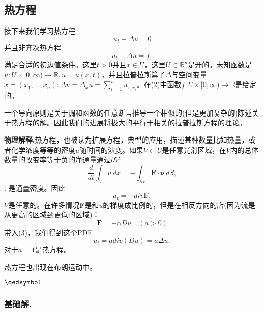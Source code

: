 \documentclass[leqno]{article}
\numberwithin{equation}{subsection}%
\begin{document}
\subsection{热方程}
接下来我们学习热方程
\begin{equation}
u_{t}-\Delta u=0
\end{equation}
并且非齐次热方程
\begin{equation}
u_{t}-\Delta u=f,
\end{equation}
满足合适的初边值条件。这里$t>0$并且$x\in U$，这里$U\subset\mathbb{R}^{n}$是开的。未知函数是$u:\bar{U}\times[0,\infty)\rightarrow\mathbb{R},u=u(x,t)$，并且拉普拉斯算子$\Delta$与空间变量$x=(x_{1},...,x_{n}):\Delta u=\Delta_{x}u=\sum_{i=1}^{n}u_{x_{i}x_{i}}$。在(2)中函数$f:U\times[0,\infty)\rightarrow\mathbb{R}$是给定的。
\par
一个导向原则是关于调和函数的任意断言推导一个相似的(但是更加复杂的)陈述关于热方程的解。因此我们的进展将极大的平行于相关的拉普拉斯方程的理论。
\par
\noindent\textbf{物理解释.}热方程，也被认为扩展方程，典型的应用，描述某种数量比如热量，或者化学浓度等等的密度$u$随时间的演变。如果$V\subset U$是任意光滑区域，在$V$内的总体数量的改变率等于负的净通量通过$\partial V$:
\begin{equation*}
\frac{d}{dt}\int_{V}u\,dx=-\int_{\partial V}\mathbf{F}\cdot\bm{\nu}\,dS,
\end{equation*}
$\mathbb{F}$是通量密度。因此
\begin{equation}
u_{t}=-div\mathbf{F},
\end{equation}
$V$是任意的。在许多情况$\mathbf{F}$是和$u$的梯度成比例的，但是在相反方向的店(因为流是从更高的区域到更低的区域)：
\begin{equation*}
\mathbf{F}=-\alpha Du\quad(a>0)
\end{equation*}
带入(3)，我们得到这个PDE
\begin{equation*}
u_{t}=a div(Du)=a\Delta u,
\end{equation*}
对于$a=1$是热方程。
\par
热方程也出现在布朗运动中。
\par
{}$\hfill\qedsymbol$
\subsubsection{基础解.}
\end{document}
